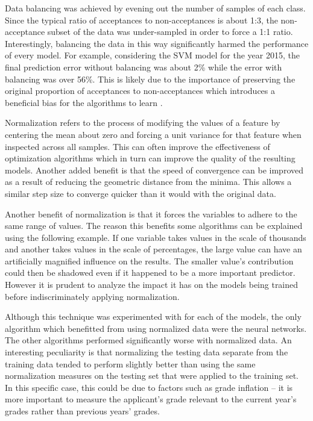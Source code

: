 Data balancing was achieved by evening out the number of samples of each class. Since the typical ratio of acceptances to non-acceptances is about 1:3, the non-acceptance subset of the data was under-sampled in order to force a 1:1 ratio. Interestingly, balancing the data in this way significantly harmed the performance of every model. For example, considering the SVM model for the year 2015, the final prediction error without balancing was about 2\% while the error with balancing was over 56\%. This is likely due to the importance of preserving the original proportion of acceptances to non-acceptances which introduces a beneficial bias for the algorithms to learn \cite{imbalanceBias}.

Normalization refers to the process of modifying the values of a feature by centering the mean about zero and forcing a unit variance for that feature when inspected across all samples. This can often improve the effectiveness of optimization algorithms which in turn can improve the quality of the resulting models. Another added benefit is that the speed of convergence can be improved as a result of reducing the geometric distance from the minima. This allows a similar step size to converge quicker than it would with the original data.

Another benefit of normalization is that it forces the variables to adhere to the same range of values. The reason this benefits some algorithms can be explained using the following example. If one variable takes values in the scale of thousands and another takes values in the scale of percentages, the large value can have an artificially magnified influence on the results. The smaller value's contribution could then be shadowed even if it happened to be a more important predictor. However  it is prudent to analyze the impact it has on the models being trained before indiscriminately applying normalization.

Although this technique was experimented with for each of the models, the only algorithm which benefitted from using normalized data were the neural networks. The other algorithms performed significantly worse with normalized data. An interesting peculiarity is that normalizing the testing data separate from the training data tended to perform slightly better than using the same normalization measures on the testing set that were applied to the training set. In this specific case, this could be due to factors such as grade inflation -- it is more important to measure the applicant's grade relevant to the current year's grades rather than previous years' grades.

